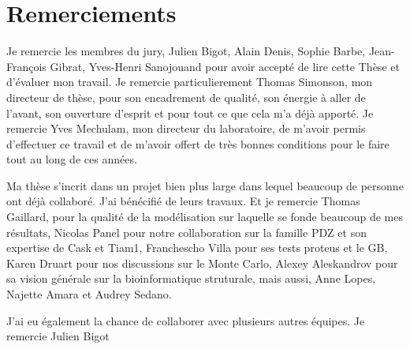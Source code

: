 \chapter*{Remerciements}

Je remercie les membres du jury, Julien Bigot, Alain Denis, Sophie Barbe, Jean-François Gibrat, Yves-Henri Sanojouand pour avoir accepté de lire cette Thèse et d'évaluer mon travail. Je remercie particulierement Thomas Simonson, mon directeur de thèse, pour son encadrement de qualité, son énergie à aller de l'avant, son ouverture d'esprit et pour tout ce que cela m'a déjà apporté. Je remercie Yves Mechulam, mon directeur du laboratoire, de m'avoir permis d'effectuer ce travail et de m'avoir offert de très bonnes conditions pour le faire tout au long de ces années.

Ma thèse s'incrit dans un projet bien plus large dans lequel beaucoup de personne ont déjà collaboré. J'ai bénécifié de leurs travaux. Et je remercie Thomas Gaillard, pour la qualité de la modélisation sur laquelle se fonde beaucoup de mes résultats, Nicolas Panel pour notre collaboration sur la famille PDZ et son expertise de Cask et Tiam1, Franchescho Villa pour ses tests proteus et le GB, Karen Druart pour nos discussions sur le Monte Carlo, Alexey Aleskandrov pour sa vision générale sur la bioinformatique struturale, mais aussi, Anne Lopes, Najette Amara et Audrey Sedano.

J'ai eu également la chance de collaborer avec plusieurs autres équipes. Je remercie Julien Bigot 





